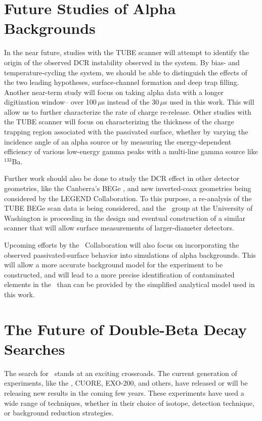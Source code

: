 \section{Future Studies of Alpha Backgrounds}
In the near future, studies with the TUBE scanner will attempt to identify the origin of the observed DCR instability observed in the system. By bias- and temperature-cycling the system, we should be able to distinguish the effects of the two leading hypotheses, surface-channel formation and deep trap filling. Another near-term study will focus on taking alpha data with a longer digitization window-- over 100\,$\mu$s instead of the 30\,$\mu$s used in this work. This will allow us to further characterize the rate of charge re-release. Other studies with the TUBE scanner will focus on characterizing the thickness of the charge trapping region associated with the passivated surface, whether by varying the incidence angle of an alpha source or by measuring the energy-dependent efficiency of various low-energy gamma peaks with a multi-line gamma source like $^{133}$Ba. 

Further work should also be done to study the DCR effect in other detector geometries, like the Canberra's BEGe \ppc, and new inverted-coax geometries being considered by the LEGEND Collaboration. To this purpose, a re-analysis of the TUBE BEGe scan data is being considered, and the \MJ\ group at the University of Washington is proceeding in the design and eventual construction of a similar scanner that will allow surface measurements of larger-diameter detectors.

Upcoming efforts by the \MJ\ Collaboration will also focus on incorporating the observed passivated-surface behavior into simulations of alpha backgrounds. This will allow a more accurate background model for the experiment to be constructed, and will lead to a more precise identification of contaminated elements in the \DEM\ than can be provided by the simplified analytical model used in this work.    

\section{The Future of Double-Beta Decay Searches}
The search for \nonubb\ stands at an exciting crossroads. The current generation of experiments, like the \DEM, CUORE, EXO-200, and others, have released or will be releasing new results in the coming few years. These experiments have used a wide range of techniques, whether in their choice of isotope, detection technique, or background reduction strategies. 

